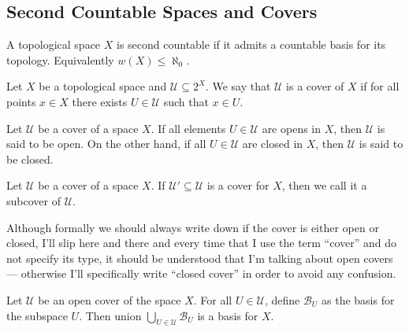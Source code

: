 \subsection{Second Countable Spaces and Covers}

\begin{definition}\label{def: second countable}
    A topological space \(X\) is second countable if it admits a countable basis
    for its topology. Equivalently \(w(X) \leq \aleph_0\).
\end{definition}

\begin{definition}[Cover]\label{def: cover}
    Let \(X\) be a topological space and \(\mathcal U \subseteq 2^X\). We say that
    \(\mathcal U\) is a cover of \(X\) if for all points \(x \in X\) there exists
    \(U \in \mathcal U\) such that \(x \in U\).
\end{definition}

\begin{definition}
    Let \(\mathcal U\) be a cover of a space \(X\). If all elements \(U \in
    \mathcal U\) are opens in \(X\), then \(\mathcal U\) is said to be open. On
    the other hand, if all \(U \in \mathcal U\) are closed in \(X\), then
    \(\mathcal U\) is said to be closed.
\end{definition}

\begin{definition}[Subcover]
    Let \(\mathcal U\) be a cover of a space \(X\). If \(\mathcal U' \subseteq
    \mathcal U\) is a cover for \(X\), then we call it a subcover of \(\mathcal
    U\).
\end{definition}

Although formally we should always write down if the cover is either open or
closed, I'll slip here and there and every time that I use the term ``cover''
and do not specify its type, it should be understood that I'm talking about open
covers --- otherwise I'll specifically write ``closed cover'' in order to avoid
any confusion.

\begin{proposition}
    \label{prop:union-cover-basis}
    Let \(\mathcal U\) be an open cover of the space \(X\). For all \(U \in \mathcal
    U\), define \(\mathcal{B}_U\) as the basis for the subspace \(U\). Then union
    \(\bigcup_{U \in \mathcal U} \mathcal{B}_U\) is a basis for \(X\).
\end{proposition}

